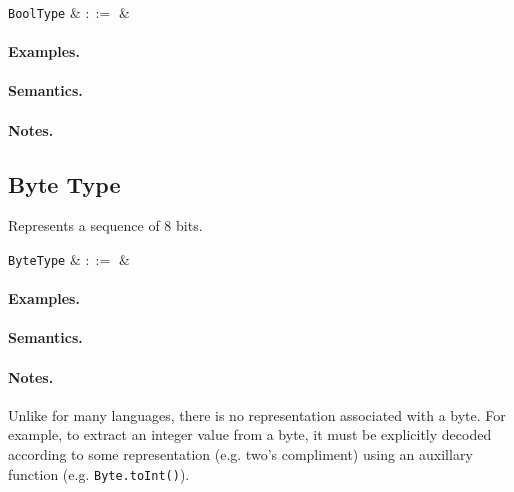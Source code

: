 \begin{syntax}
 \verb+BoolType+ & $::=$ &  \\
\end{syntax}

\paragraph{Examples.}

\paragraph{Semantics.}

\paragraph{Notes.} 


\subsection{Byte Type}

Represents a sequence of 8 bits. 

\begin{syntax}
 \verb+ByteType+ & $::=$ &  \\
\end{syntax}

\paragraph{Examples.}

\paragraph{Semantics.}

\paragraph{Notes.}  Unlike for many languages, there is no
representation associated with a byte. For example, to extract an
integer value from a byte, it must be explicitly decoded according to
some representation (e.g. two's compliment) using an auxillary function (e.g. \lstinline{Byte.toInt()}).



